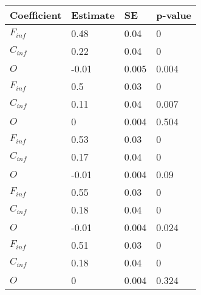 \begin{tabular}{llll}
Coefficient & Estimate & SE & p-value \\ 
\hline 
$F_{inf}$ & 0.48 & 0.04 & 0 \\ 
$C_{inf}$ & 0.22 & 0.04 & 0 \\ 
$O$ & -0.01 & 0.005 & 0.004 \\ 
$F_{inf}$ & 0.5 & 0.03 & 0 \\ 
$C_{inf}$ & 0.11 & 0.04 & 0.007 \\ 
$O$ & 0 & 0.004 & 0.504 \\ 
$F_{inf}$ & 0.53 & 0.03 & 0 \\ 
$C_{inf}$ & 0.17 & 0.04 & 0 \\ 
$O$ & -0.01 & 0.004 & 0.09 \\ 
$F_{inf}$ & 0.55 & 0.03 & 0 \\ 
$C_{inf}$ & 0.18 & 0.04 & 0 \\ 
$O$ & -0.01 & 0.004 & 0.024 \\ 
$F_{inf}$ & 0.51 & 0.03 & 0 \\ 
$C_{inf}$ & 0.18 & 0.04 & 0 \\ 
$O$ & 0 & 0.004 & 0.324 \\ 
\hline 
\end{tabular}